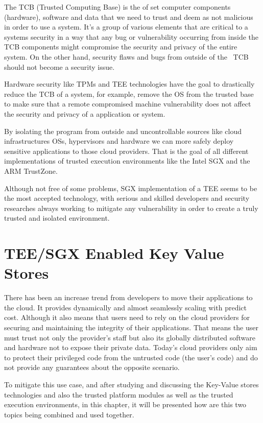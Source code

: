 The \gls{TCB} (Trusted Computing Base) is the of set computer components (hardware), software and data that we need to trust and deem as not malicious in order to use a system. It's a group of various elements that are critical to a systems security in a way that any bug or vulnerability occurring from inside the \gls{TCB} components might compromise the security and privacy of the entire system. On the other hand, security flaws and bugs from outside of the ~\gls{TCB} should not become a security issue.

Hardware security like \glspl{TPM} and \gls{TEE} technologies have the goal to drastically reduce the \gls{TCB} of a system, for example, remove the \gls{OS} from the trusted base to make sure that a remote compromised machine vulnerability does not affect the security and privacy of a application or system.

By isolating the program from outside and uncontrollable sources like cloud infrastructures \glspl{OS}, hypervisors and hardware we can more safely deploy sensitive applications to those cloud providers.
That is the goal of all different implementations of trusted execution environments like the Intel \gls{SGX} and the ARM TrustZone.

Although not free of some problems, \gls{SGX} implementation of a \gls{TEE} seems to be the most accepted technology, with serious and skilled developers and security researches always working to mitigate any vulnerability in order to create a truly trusted and isolated environment.

\section{TEE/SGX Enabled Key Value Stores} %
\label{sec:sgx_enabled_key_value_stores}

There has been an increase trend from developers to move their applications to the cloud. It provides dynamically and almost seamlessly scaling with predict cost. Although it also means that users need to rely on the cloud providers for securing and maintaining the integrity of their applications. That means the user must trust not only the provider's staff but also its globally distributed software and hardware not to expose their private data. Today's cloud providers only aim to protect their privileged code from the untrusted code (the user's code) and do not provide any guarantees about the opposite scenario.

To mitigate this use case, and after studying and discussing the Key-Value stores technologies and also the trusted platform modules as well as the trusted execution environments, in this chapter, it will be presented how are this two topics being combined and used together. 

